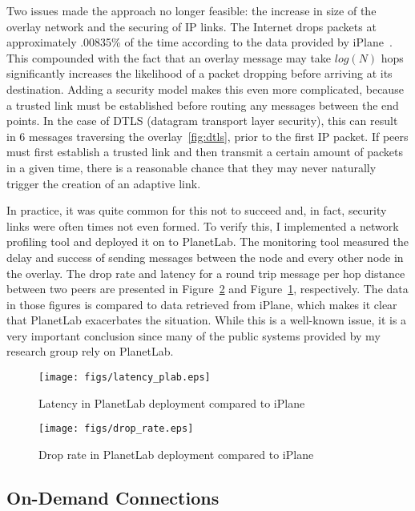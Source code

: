 Two issues made the approach no longer feasible:  the increase in size of the
overlay network and the securing of IP links.  The Internet drops packets at
approximately .00835\% of the time according to the data provided by
iPlane~\cite{iplane}.  This compounded with the fact that an overlay message
may take $log(N)$ hops significantly increases the likelihood of a packet
dropping before arriving at its destination.  Adding a security model makes
this even more complicated, because a trusted link must be established before
routing any messages between the end points.  In the case of DTLS (datagram
transport layer security), this can result in 6 messages traversing the
overlay~\ref{fig:dtls}, prior to the first IP packet.  If peers must first
establish a trusted link and then transmit a certain amount of packets in a
given time, there is a reasonable chance that they may never naturally trigger
the creation of an adaptive link.

In practice, it was quite common for this not to succeed and, in fact, security
links were often times not even formed.  To verify this, I implemented a
network profiling tool and deployed it on to PlanetLab.  The monitoring tool
measured the delay and success of sending messages between the node and every
other node in the overlay.  The drop rate and latency for a round trip message
per hop distance between two peers are presented in
Figure~\ref{fig:drop_rate_plab} and Figure~\ref{fig:latency_plab},
respectively.  The data in those figures is compared to data retrieved from
iPlane, which makes it clear that PlanetLab exacerbates the situation.  While
this is a well-known issue, it is a very important conclusion since many of the
public systems provided by my research group rely on PlanetLab.

\begin{figure}
\centering
\texttt{[image: figs/latency\_plab.eps]}
\caption{Latency in PlanetLab deployment compared to iPlane}
\label{fig:latency_plab}
\end{figure}

\begin{figure}
\centering
\texttt{[image: figs/drop\_rate.eps]}
\caption{Drop rate in PlanetLab deployment compared to iPlane}
\label{fig:drop_rate_plab}
\end{figure}

\subsection{On-Demand Connections}

